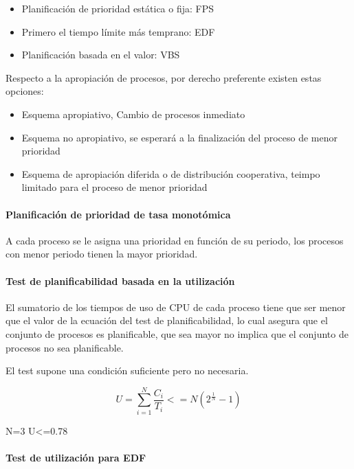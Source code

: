 \begin{itemize}
	\item Planificación de prioridad estática o fija: FPS
	\item Primero el tiempo límite más temprano: EDF
	\item Planificación basada en el valor: VBS
\end{itemize}

Respecto a la apropiación de procesos, por derecho preferente existen estas
opciones:

\begin{itemize}
	\item Esquema apropiativo, Cambio de procesos inmediato
	\item Esquema no apropiativo, se esperará a la finalización del proceso
		de menor prioridad
	\item Esquema de apropiación diferida o de distribución cooperativa,
		teimpo limitado para el proceso de menor prioridad
\end{itemize}

\paragraph{Planificación de prioridad de tasa monotómica}

A cada proceso se le asigna una prioridad en función de su periodo, los 
procesos con menor periodo tienen la mayor prioridad.

\paragraph{Test de planificabilidad basada en la utilización}

El sumatorio de los tiempos de uso de CPU de cada proceso tiene que ser menor
que el valor de la ecuación del test de planificabilidad, lo cual asegura que
el conjunto de procesos es planificable, que sea mayor no implica que el
conjunto de procesos no sea planificable.

El test supone una condición suficiente pero no necesaria.

\begin{equation}\label{key}
	U=\sum_{i=1}^{N}\frac{C_{i}}{T_{i}}<=N(2^{\frac{1}{N}}-1)
\end{equation}

N=3 U<=0.78

\paragraph{Test de utilización para EDF}

